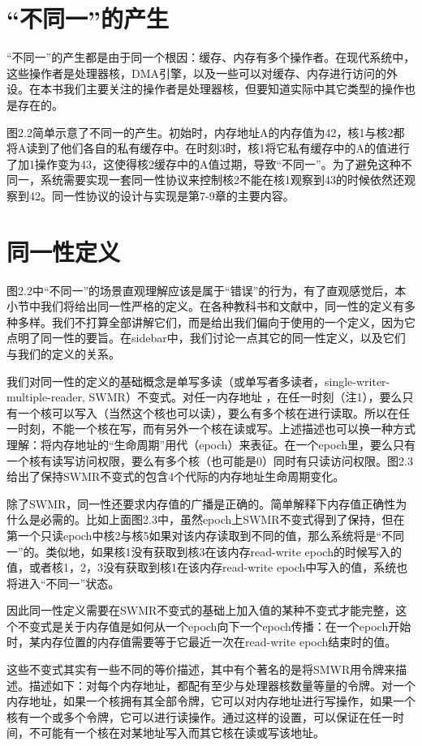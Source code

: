 \documentclass[UTF-8]{ctexrep}
\begin{document}
\section{“不同一”的产生}
“不同一”的产生都是由于同一个根因：缓存、内存有多个操作者。在现代系统中，这些操作者是处理器核，DMA引擎，以及一些可以对缓存、内存进行访问的外设。在本书我们主要关注的操作者是处理器核，但要知道实际中其它类型的操作也是存在的。
\par 图2.2简单示意了不同一的产生。初始时，内存地址A的内存值为42，核1与核2都将A读到了他们各自的私有缓存中。在时刻3时，核1将它私有缓存中的A的值进行了加1操作变为43，这使得核2缓存中的A值过期，导致“不同一”。为了避免这种不同一，系统需要实现一套同一性协议来控制核2不能在核1观察到43的时候依然还观察到42。同一性协议的设计与实现是第7-9章的主要内容。
\section{同一性定义}
图2.2中“不同一”的场景直观理解应该是属于“错误”的行为，有了直观感觉后，本小节中我们将给出同一性严格的定义。在各种教科书和文献中，同一性的定义有多种多样。我们不打算全部讲解它们，而是给出我们偏向于使用的一个定义，因为它点明了同一性的要旨。在sidebar中，我们讨论一点其它的同一性定义，以及它们与我们的定义的关系。
\par 我们对同一性的定义的基础概念是单写多读（或单写者多读者，single-writer-multiple-reader, SWMR）不变式。对任一内存地址 ，在任一时刻（注1），要么只有一个核可以写入（当然这个核也可以读），要么有多个核在进行读取。所以在任一时刻，不能一个核在写，而有另外一个核在读或写。上述描述也可以换一种方式理解：将内存地址的“生命周期”用代（epoch）来表征。在一个epoch里，要么只有一个核有读写访问权限，要么有多个核（也可能是0）同时有只读访问权限。图2.3给出了保持SWMR不变式的包含4个代际的内存地址生命周期变化。
\par 除了SWMR，同一性还要求内存值的广播是正确的。简单解释下内存值正确性为什么是必需的。比如上面图2.3中，虽然epoch上SWMR不变式得到了保持，但在第一个只读epoch中核2与核5如果对该内存读取到不同的值，那么系统将是“不同一”的。类似地，如果核1没有获取到核3在该内存read-write epoch的时候写入的值，或者核1，2，3没有获取到核1在该内存read-write epoch中写入的值，系统也将进入“不同一”状态。
\par 因此同一性定义需要在SWMR不变式的基础上加入值的某种不变式才能完整，这个不变式是关于内存值是如何从一个epoch向下一个epoch传播：在一个epoch开始时，某内存位置的内存值需要等于它最近一次在read-write epoch结束时的值。
\par 这些不变式其实有一些不同的等价描述，其中有个著名的是将SMWR用令牌来描述。描述如下：对每个内存地址，都配有至少与处理器核数量等量的令牌。对一个内存地址，如果一个核拥有其全部令牌，它可以对内存地址进行写操作，如果一个核有一个或多个令牌，它可以进行读操作。通过这样的设置，可以保证在任一时间，不可能有一个核在对某地址写入而其它核在读或写该地址。
\end{document}
